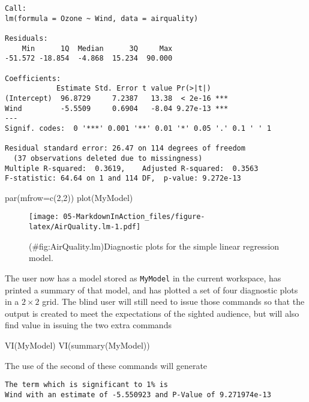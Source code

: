 \documentclass[
]{book}
\newenvironment{Shaded}{\begin{snugshade}}{\end{snugshade}}
\newcommand{\AttributeTok}[1]{\textcolor[rgb]{0.77,0.63,0.00}{#1}}
\newcommand{\DecValTok}[1]{\textcolor[rgb]{0.00,0.00,0.81}{#1}}
\newcommand{\FunctionTok}[1]{\textcolor[rgb]{0.00,0.00,0.00}{#1}}
\newcommand{\NormalTok}[1]{#1}
\begin{document}
\begin{verbatim}
Call:
lm(formula = Ozone ~ Wind, data = airquality)

Residuals:
    Min      1Q  Median      3Q     Max 
-51.572 -18.854  -4.868  15.234  90.000 

Coefficients:
            Estimate Std. Error t value Pr(>|t|)    
(Intercept)  96.8729     7.2387   13.38  < 2e-16 ***
Wind         -5.5509     0.6904   -8.04 9.27e-13 ***
---
Signif. codes:  0 '***' 0.001 '**' 0.01 '*' 0.05 '.' 0.1 ' ' 1

Residual standard error: 26.47 on 114 degrees of freedom
  (37 observations deleted due to missingness)
Multiple R-squared:  0.3619,    Adjusted R-squared:  0.3563 
F-statistic: 64.64 on 1 and 114 DF,  p-value: 9.272e-13
\end{verbatim}

\begin{Shaded}
\begin{Highlighting}[]
\FunctionTok{par}\NormalTok{(}\AttributeTok{mfrow=}\FunctionTok{c}\NormalTok{(}\DecValTok{2}\NormalTok{,}\DecValTok{2}\NormalTok{))}
\FunctionTok{plot}\NormalTok{(MyModel)}
\end{Highlighting}
\end{Shaded}

\begin{figure}
\centering
\texttt{[image: 05-MarkdownInAction\_files/figure-latex/AirQuality.lm-1.pdf]}
\caption{(\#fig:AirQuality.lm)Diagnostic plots for the simple linear regression model.}
\end{figure}

The user now has a model stored as \texttt{MyModel} in the current workspace, has printed a summary of that model, and has plotted a set of four diagnostic plots in a \(2\times{}2\) grid. The blind user will still need to issue those commands so that the output is created to meet the expectations of the sighted audience, but will also find value in issuing the two extra commands

\begin{Shaded}
\begin{Highlighting}[]
\FunctionTok{VI}\NormalTok{(MyModel)}
\FunctionTok{VI}\NormalTok{(}\FunctionTok{summary}\NormalTok{(MyModel))}
\end{Highlighting}
\end{Shaded}

The use of the second of these commands will generate

\begin{verbatim}
The term which is significant to 1% is
Wind with an estimate of -5.550923 and P-Value of 9.271974e-13 
\end{verbatim}
\end{document}
